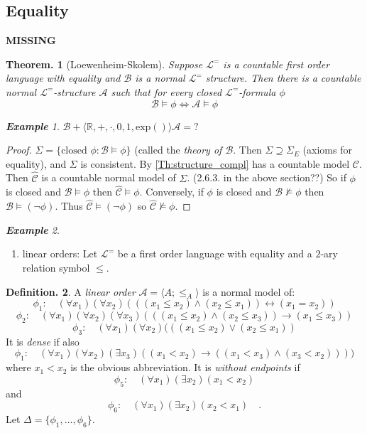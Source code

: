 \documentclass[a4paper,oneside,11pt,DIV=12,parskip=half]{scrartcl}
\newcommand{\R}{\mathbb R}
\newcommand{\LL}{\mathcal L}
\newcommand{\A}{\mathcal A}
\newcommand{\C}{\mathcal C}
\theoremstyle{plain}
\newtheorem{theorem}{Theorem.}[section]
\theoremstyle{definition}
\newtheorem{definition}[theorem]{Definition.}
\newtheorem{remark, definition}[theorem]{Remark and Definition.}
\newtheorem{lemma, definition}[theorem]{Lemma and Definition.}
\newtheorem{theorem, definition}[theorem]{Theorem and Definition.}
\theoremstyle{remark}
\newtheorem*{example}{\textbf{Example}}
\newtheorem*{remark, example}{\textbf{Remark and Exercise}}
\begin{document}
\subsection{Equality}
\textbf{MISSING}

\begin{theorem}[Loewenheim-Skolem]\label{Th:Loewenheim_Skolem}
Suppose $\LL^=$ is a countable first order language with equality and $\mathcal{B}$ is a normal $\LL^=$ structure. Then there is a countable normal $\LL^=$-structure $\A$ such that for every closed $\LL^=$-formula $\phi$
    \[ \mathcal{B} \vDash \phi \Leftrightarrow \A \vDash \phi \]
\end{theorem}

\begin{example}
$\mathcal{B} + \langle \R, +, \cdot, 0, 1, \mathrm{exp}() \rangle
\A = ?
$
\end{example}

\begin{proof}
$\Sigma = \{ \text{closed } \phi : \mathcal{B} \vDash \phi \}$ (called the \emph{theory of $\mathcal{B}$}. Then $\Sigma \supseteq \Sigma_E$ (axioms for equality), and $\Sigma$ is consistent. By \ref{Th:structure_compl} has a countable model $\C$. Then $\hat{\C}$ is a countable normal model of $\Sigma$. (2.6.3. in the above section??)
So if $\phi$ is closed and $\mathcal{B} \vDash \phi$ then $\hat{\C} \vDash \phi$. Conversely, if $\phi$ is closed and $\mathcal{B} \not \vDash \phi$ then $\mathcal{B} \vDash (\lnot\phi)$. Thus $\hat{\C} \vDash (\lnot \phi)$ so $\hat{\C} \not \vDash \phi$.
\end{proof}

\begin{example}
\begin{enumerate}
    \item linear orders:
    Let $\LL^=$ be a first order language with equality and a $2$-ary relation symbol $\leq$.
\end{enumerate}
\end{example}

\begin{definition}
     A \emph{linear order} $\A = \langle A; \leq_A \rangle$ is a normal model of:
        \[ \phi_1: \quad (\forall x_1)(\forall x_2) (((x_1 \leq x_2) \land (x_2 \leq x_1)) \leftrightarrow (x_1 = x_2)) \]
        \[ \phi_2: \quad (\forall x_1)(\forall x_2)(\forall x_3) (((x_1 \leq x_2) \land (x_2 \leq x_3)) \rightarrow (x_1 \leq x_3)) \]
        \[ \phi_3: \quad (\forall x_1)(\forall x_2) (((x_1 \leq x_2) \lor (x_2 \leq x_1)) \]
    It is \emph{dense} if also
        \[ \phi_1: \quad (\forall x_1)(\forall x_2)(\exists x_3) ((x_1 < x_2) \rightarrow ((x_1 < x_3) \land (x_3 < x_2)))) \]
    where $x_1 < x_2$ is the obvious abbreviation.
    It is \emph{without endpoints} if 
        \[ \phi_5: \quad (\forall x_1)(\exists x_2) (x_1 < x_2) \]
    and
        \[ \phi_6: \quad (\forall x_1)(\exists x_2) (x_2 < x_1) \quad . \]
    Let $\Delta = \{\phi_1, \dots,\phi_6\}$.
\end{definition}
\end{document}
